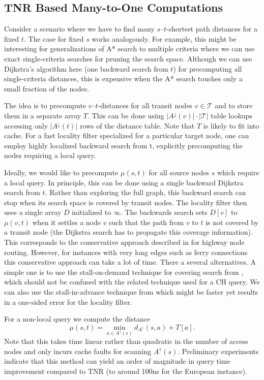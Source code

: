 \documentclass{llncs}
\begin{document}
\subsection{TNR Based Many-to-One Computations}\label{s:manyToOne}

Consider a scenario where we have to find many $s$--$t$-shortest path distances for a fixed $t$. The case for fixed $s$ works analogously. For example, this might be interesting for generalizations of A* search to multiple criteria where we can use exact single-criteria searches for pruning the search space. Although we can use Dijkstra's algorithm here (one backward search from $t$) for precomputing all single-criteria distances, this is expensive when the A* search touches only a small fraction of the nodes. 

The idea is to precompute $v$--$t$-distances for all transit nodes $v\in\mathcal{T}$ and to store them in a separate array $T$. 
This can be done using $|A^\downarrow(v)|\cdot|\mathcal{T}|$ table lookups accessing only $|A^\downarrow(t)|$ rows of the distance table.
Note that $T$ is likely to fit into cache. 
For a fast locality filter specialized for a particular target node, one can employ highly localized backward search from t, explicitly precomputing the nodes requiring a local query.

Ideally, we would like to precompute $\mu(s, t)$ for all source nodes $s$ which require a local query. 
In principle, this can be done using a single backward Dijkstra search from $t$. 
Rather than exploring the full graph, this backward search can stop when its search space is covered by transit nodes. 
The locality filter then uses a single array $D$ initialized to $\infty$. 
The backwards search sets $D[v]$ to $\mu(v, t)$ when it settles a node $v$ such that the path from $v$ to $t$ is not covered by a transit node (the Dijkstra search has to propagate this coverage information).
This corresponds to the conservative approach described in \cite{s-rprn-08} for highway node routing. 
However, for instances with very long edges such as ferry connections this conservative approach can take a lot of time.
There a several alternatives. 
A simple one is to use the stall-on-demand technique for covering search from \cite{s-rprn-08}, which should not be confused with the related technique used for a CH query.
We can also use the stall-in-advance technique from \cite{s-rprn-08} which might be faster yet results in a one-sided error for the locality filter.

For a non-local query we compute the distance
$$\mu(s,t)=\min_{a\in A^\uparrow(s)}d_{A^\uparrow}(s,a)+T[a].$$
Note that this takes time linear rather than quadratic in the number of access nodes and only incurs cache faults for scanning $A^\uparrow(s)$.
Preliminary experiments indicate that this method can yield an order of magnitude in query time improvement compared to TNR (to around 100ns for the European instance).
\end{document}
